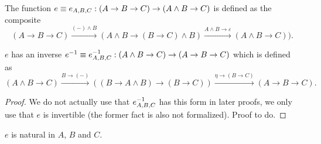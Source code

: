 \documentclass{article}
\newcommand{\pmap}{\to}
\newcommand{\lpmap}{\xrightarrow}
\renewcommand{\smash}{\wedge}
\renewcommand{\epsilon}{\varepsilon}
\begin{document}
\begin{defn}
The function $e\jdeq e_{A,B,C}:(A\pmap B\pmap C)\pmap(A\smash B\pmap C)$ is defined as the composite
$$(A\pmap B\pmap C)\lpmap{({-})\smash B}(A\smash B\pmap (B\pmap C)\smash B)\lpmap{A\smash B \pmap\epsilon}(A\smash B\pmap C)).$$

\begin{lem}
$e$ has an inverse $\inv e\jdeq \inv{e}_{A,B,C}:(A\smash B\pmap C)\pmap(A\pmap B\pmap C)$ which is defined as
$$(A\smash B\pmap C)\lpmap{B\pmap({-})}((B\pmap A\smash B)\pmap (B\pmap C))\lpmap{\eta\pmap(B\pmap C)}(A\pmap B\pmap C).$$
\begin{proof}
We do not actually use that ${e}^{-1}_{A,B,C}$ has this form in later proofs, we only use that $e$ is invertible (the former fact is also not formalized). Proof to do.
\end{proof}
\end{lem}
\end{defn}
\begin{lem}
$e$ is natural in $A$, $B$ and $C$.
\end{lem}
\end{document}
